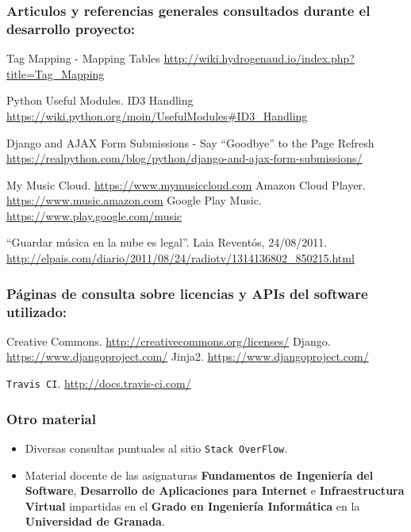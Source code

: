 
\subsubsection*{Articulos y referencias generales consultados durante el desarrollo proyecto:}

 Tag Mapping - Mapping Tables \url{http://wiki.hydrogenaud.io/index.php?title=Tag_Mapping}

 Python Useful Modules. ID3 Handling \url{https://wiki.python.org/moin/UsefulModules#ID3_Handling}

 Django and AJAX Form Submissions - Say ``Goodbye'' to the Page Refresh \url{https://realpython.com/blog/python/django-and-ajax-form-submissions/}

 My Music Cloud. \url{https://www.mymusiccloud.com}
 Amazon Cloud Player. \url{https://www.music.amazon.com}
 Google Play Music. \url{https://www.play.google.com/music}

 ``Guardar música en la nube es legal''. Laia Reventós, 24/08/2011. \url{http://elpais.com/diario/2011/08/24/radiotv/1314136802_850215.html}

\bigskip


\subsubsection*{Páginas de consulta sobre licencias y APIs del software utilizado:}
 Creative Commons. \url{http://creativecommons.org/licenses/}
 Django. \url{https://www.djangoproject.com/}
 Jinja2. \url{https://www.djangoproject.com/}

 {\tt Travis CI}. \url{http://docs.travis-ci.com/}

\bigskip


\subsubsection*{Otro material}
\begin{itemize}
	\item Diversas consultas puntuales al sitio {\tt Stack OverFlow}.
	\item Material docente de las asignaturas \textbf{Fundamentos de Ingeniería del Software}, \textbf{Desarrollo de Aplicaciones para Internet} e \textbf{Infraestructura Virtual} impartidas en el \textbf{Grado en Ingeniería Informática} en la \textbf{Universidad de Granada}.
\end{itemize}
